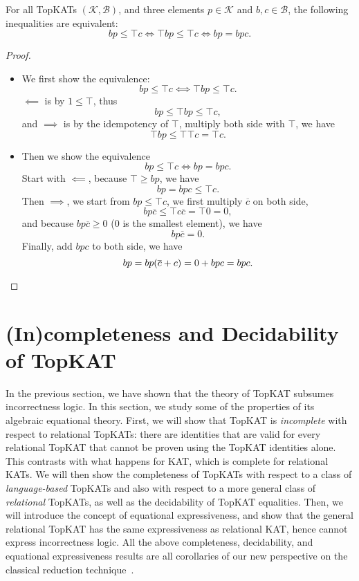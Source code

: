 \begin{theorem}\label{the: hoare logic formulation equivalent}
  For all TopKATs \((𝒦, ℬ)\), and three elements
  \(p \in 𝒦\) and \(b, c \in ℬ\), the following inequalities
  are equivalent:
    \[b p \leq \top c  \iff  \top b p \leq \top c \iff b p = b p c.\]
\end{theorem}

\begin{proof}
\begin{itemize}
    \item We first show the equivalence:
        \[b p ≤ ⊤ c  ⟺  ⊤ b p ≤ ⊤ c.\]
        \(⟸\) is by \(1 ≤ ⊤\),
        thus \[b p \leq \top b p \leq \top c,\]
        and \(⟹\) is by the idempotency of \(\top\),
        multiply both side with \(\top\), we have 
        \[\top b p \leq \top \top c = \top c.\]
    \item Then we show the equivalence
        \[b p \leq \top c  \iff  b p = b p c.\]
        Start with \(⟸\), because \(⊤ ≥ b p\), we have
        \[b p = b p c ≤ ⊤ c.\]
        Then \(⟹\), we start from \(b p ≤ ⊤ c\),
        we first multiply \(\overline{c}\) on both side,
        \[b p \overline{c} \leq \top c \overline{c} = \top 0 = 0,\]
        and because \(b p \overline{c} \geq 0\) (\(0\) is the smallest element),
        we have \[b p \overline{c} = 0.\]
        Finally, add \(b p c\) to both side, we have
        \[b p = b p (\overline{c} + c) = 0 + b p c = b p c.\qedhere\]
\end{itemize}
\end{proof}

\section{(In)completeness and Decidability of TopKAT}\label{sec: properties of TopKAT}


In the previous section, we have shown that the theory of TopKAT subsumes incorrectness logic. In this section, we study some of the properties of its algebraic equational theory.
%
First, we will show that TopKAT is \emph{incomplete} with respect to relational
TopKATs: there are identities that are valid for every relational TopKAT that
cannot be proven using the TopKAT identities alone. This contrasts with what
happens for KAT, which is complete for relational KATs.
%
We will then show the completeness of TopKATs with respect to a class of \emph{language-based} TopKATs and also with respect to a more general class of \emph{relational} TopKATs, as well as the decidability of TopKAT equalities.
Then, we will introduce the concept of equational expressiveness,
and show that the general relational TopKAT has the same expressiveness as relational KAT,
hence cannot express incorrectness logic.
All the above completeness, decidability, and equational expressiveness results are all corollaries of our new perspective on the classical reduction technique~\cite{Pous_Rot_Wagemaker_2021,Kozen_Smith_1997}.

